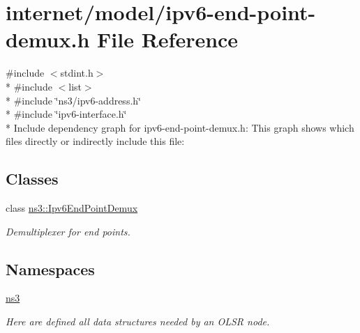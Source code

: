 \hypertarget{ipv6-end-point-demux_8h}{}\section{internet/model/ipv6-\/end-\/point-\/demux.h File Reference}
\label{ipv6-end-point-demux_8h}
{\ttfamily \#include $<$stdint.\+h$>$}\\*
{\ttfamily \#include $<$list$>$}\\*
{\ttfamily \#include \char`\"{}ns3/ipv6-\/address.\+h\char`\"{}}\\*
{\ttfamily \#include \char`\"{}ipv6-\/interface.\+h\char`\"{}}\\*
Include dependency graph for ipv6-\/end-\/point-\/demux.h\+:
This graph shows which files directly or indirectly include this file\+:
\subsection*{Classes}
\begin{DoxyCompactItemize}
\item 
class \hyperlink{classns3_1_1Ipv6EndPointDemux}{ns3\+::\+Ipv6\+End\+Point\+Demux}
\begin{DoxyCompactList}\small\item\em Demultiplexer for end points. \end{DoxyCompactList}\end{DoxyCompactItemize}
\subsection*{Namespaces}
\begin{DoxyCompactItemize}
\item 
 \hyperlink{namespacens3}{ns3}
\begin{DoxyCompactList}\small\item\em Here are defined all data structures needed by an O\+L\+SR node. \end{DoxyCompactList}\end{DoxyCompactItemize}
